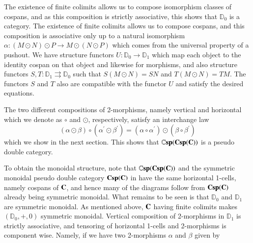 \documentclass[oneside]{amsart}
\newcommand{\lC}{\ensuremath{\mathbb{C}}}
\newcommand{\lD}{\ensuremath{\mathbb{D}}}
\theoremstyle{definition}
\theoremstyle{remark}
\numberwithin{equation}{section}
\begin{document}
The existence of finite colimits allows us to compose isomorphism classes of cospans, and as this composition is strictly associative, this shows that $\lD_{0}$ is a category. The existence of finite colimits allows us to compose cospans, and this composition is associative only up to a natural isomorphism $\alpha \colon (M \odot N) \odot P \to M \odot (N \odot P)$ which comes from the universal property of a pushout. We have structure functors $U \colon \lD_{0} \to \lD_{1}$ which map each object to the identity cospan on that object and likewise for morphisms, and also structure functors $S,T \colon \lD_{1} \rightrightarrows \lD_{0}$ such that $S(M \odot N)=SN$ and $T(M \odot N)=TM$. The functors $S$ and $T$ also are compatible with the functor $U$ and satisfy the desired equations.

The two different compositions of 2-morphisms, namely vertical and horizontal which we denote as $\circ$ and $\odot$, respectively, satisfy an interchange law $$(\alpha \odot \beta) \circ (\alpha^\prime \odot \beta^\prime) = (\alpha \circ \alpha^\prime) \odot (\beta \circ \beta^\prime)$$
which we show in the next section. This shows that $\lC \bold{sp(Csp(C))}$ is a pseudo double category.

To obtain the monoidal structure, note that $\lC \bold{sp(Csp(C))}$ and the symmetric monoidal pseudo double category $\bold{Csp(C)}$ in \cite{Cour} have the same horizontal 1-cells, namely cospans of $\bold{C}$, and hence many of the diagrams follow from $\bold{Csp(C)}$ already being symmetric monoidal. What remains to be seen is that $\lD_{0}$ and $\lD_{1}$ are symmetric monoidal. As mentioned above, $\bold{C}$ having finite colimits makes $(\lD_{0},+,0)$ symmetric monoidal. Vertical composition of 2-morphisms in $\lD_{1}$ is strictly associative, and tensoring of horizontal 1-cells and 2-morphisms is component wise. Namely, if we have two 2-morphisms $\alpha$ and $\beta$ given by
\end{document}
